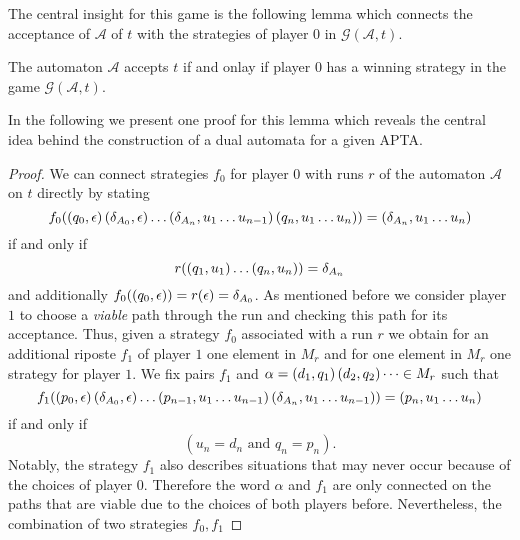 The central insight for this game is the 
following lemma which connects the acceptance of $\mathcal{A}$ of $t$ with the
strategies of player $0$ in $\mathcal{G}(\mathcal{A}, t)$.
\begin{lemma}
  \cite[Lemma 3.1.]{AltTreeAuto}
  The automaton $\mathcal{A}$ accepts $t$ if and onlay if player $0$ has a 
  winning strategy in the game $\mathcal{G}(\mathcal{A}, t)$.
  \label{lem:stratacceptance}
\end{lemma}
In the following we present one proof for this lemma which reveals the 
central idea behind the construction of a dual automata for a given \ac{APTA}.
\begin{proof}
  We can connect strategies $f_{0}$ for player $0$ with runs $r$ of the 
  automaton $\mathcal{A}$ on $t$ directly by stating
  \begin{equation*}
    f_{0}(\left(q_{0},\epsilon\right)\left(\delta_{A_{0}},\epsilon\right)\dots
    \left(\delta_{A_{n}}, u_{1}\dots u_{n-1}\right)\left(q_{n},u_{1}\dots u_{n}\right)) =
    \left(\delta_{A_{n}},u_{1}\dots u_{n}\right)
  \end{equation*}
  if and only if 
  \begin{equation*}
    r(\left(q_{1}, u_{1}\right)\dots\left(q_{n}, u_{n}\right)) = \delta_{A_{n}}
  \end{equation*}
  and additionally $f_{0}(\left(q_{0},\epsilon\right)) =r(\epsilon)=\delta_{A_{0}}$. 
  As mentioned before we consider player $1$ to choose a \emph{viable} path 
  through the run and checking this path for its acceptance. Thus, given a 
  strategy $f_{0}$ associated with a run $r$ we obtain for an additional 
  riposte $f_{1}$ of player $1$ one element in $M_{r}$ and for one element in 
  $M_{r}$ one strategy for player $1$. We fix pairs $f_{1}$ and $\alpha = 
  \left(d_{1}, q_{1}\right)\left(d_{2}, q_{2}\right)\dots\in M_{r}$ such that
  \begin{equation*}
    f_{1}(\left(p_{0},\epsilon\right)\left(\delta_{A_{0}},\epsilon\right)\dots
    \left(p_{n-1},u_{1}\dots u_{n-1}\right)\left(\delta_{A_{n}},u_{1}\dots u_{n-1}\right))
    = \left(p_{n}, u_{1}\dots u_{n}\right)
  \end{equation*}
  if and only if 
  \begin{equation*}
    (u_{n} = d_{n}\text{ and }q_{n} = p_{n}).
  \end{equation*}
  Notably, the strategy $f_{1}$ also describes situations that may never occur
  because of the choices of player $0$. Therefore the word $\alpha$ and $f_{1}$
  are only connected on the paths that are viable due to the choices of both
  players before. Nevertheless, the combination of two strategies $f_{0},f_{1}$ 

\end{proof}
